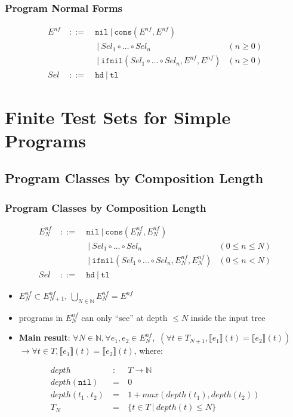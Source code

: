\documentclass{beamer}
\begin{document}
\begin{frame}
  \frametitle{Program Normal Forms}
  \[\begin{array}{lclr}
  E^{nf} & ~::=~ & \texttt{nil} ~|~ \texttt{cons}(E^{nf}, E^{nf}) & \\
         &       & ~|~ \mathit{Sel}_1 \circ \ldots \circ \mathit{Sel}_n & (n \ge 0) \\
         &       & ~|~ \texttt{ifnil}(\mathit{Sel}_1 \circ \ldots \circ \mathit{Sel}_n, E^{nf}, E^{nf}) & (n \ge 0) \\
  \mathit{Sel} & ~::=~ & \texttt{hd} ~|~ \texttt{tl} & 
  \end{array}
  \]
  
\end{frame}

\section{Finite Test Sets for Simple Programs}

\subsection{Program Classes by Composition Length}

\begin{frame}
  \frametitle{Program Classes by Composition Length}
  \[\begin{array}{lclr}
  E^{nf}_N & ~::=~ & \texttt{nil} ~|~ \texttt{cons}(E^{nf}_N, E^{nf}_N) & \\
         &       & ~|~ \mathit{Sel}_1 \circ \ldots \circ \mathit{Sel}_n & (0 \le n \le N) \\
         &       & ~|~ \texttt{ifnil}(\mathit{Sel}_1 \circ \ldots \circ \mathit{Sel}_n, E^{nf}_N, E^{nf}_N) & (0 \le n < N) \\
  \mathit{Sel} & ~::=~ & \texttt{hd} ~|~ \texttt{tl} & 
  \end{array}
  \]
  \pause
  \begin{itemize}
    \item $E^{nf}_N \subset E^{nf}_{N+1}$, $\bigcup_{N \in \mathbb{N}} E^{nf}_N = E^{nf}$
  \pause
    \item programs in $E^{nf}_N$ can only ``see'' at depth $\le N$ inside the input tree  
  \pause
    \item \textbf{Main result}:
    $\forall N \in \mathbb{N}, \forall e_1, e_2 \in E^{nf}_N,$ 
    $(\forall t \in T_{N+1}, \llbracket e_1 \rrbracket (t) = \llbracket e_2 \rrbracket (t))$
    $\rightarrow \forall t \in T, \llbracket e_1 \rrbracket (t) = \llbracket e_2 \rrbracket (t)$, where:
  \end{itemize}
    \[\begin{array}{lcl}
    \mathit{depth} & ~:~ & T \rightarrow \mathbb{N} \\
    \mathit{depth}(\texttt{nil}) & ~=~ & 0 \\
    \mathit{depth}(t_1 ~.~ t_2) & ~=~ & 1 + \mathit{max}(\mathit{depth}(t_1), \mathit{depth}(t_2)) \\
    T_{N} & ~=~ & \{t \in T ~|~ \mathit{depth}(t) \le N \} 
    \end{array}
    \]
\end{frame}
\end{document}
